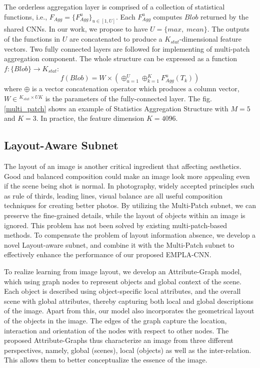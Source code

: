 \documentclass[10pt,twocolumn,letterpaper]{article}
\begin{document}
The orderless aggregation layer is comprised of a collection of statistical functions, 
i.e., ${F_{Agg}} = {\{ F_{Agg}^u\} _{u \in [1,U]}}$. Each $F_{Agg}^u$ computes
$Blob$ returned by the shared CNNs. In our work, we propose to have $U = \{ max,\;mean\} $. 
The outputs of the functions in $U$ are concatenated to produce a ${K_{stat}}$-dimensional feature vectors. Two fully connected layers are followed for implementing of multi-patch
aggregation component. The whole structure can be expressed as a function 
$f:\{ Blob\}  \to {{{K_{stat}}}}$:
\[f(Blob) = W \times ( \oplus _{u = 1}^U \oplus _{k = 1}^KF_{Agg}^u({T_k}))\]
where $ \oplus$ is a vector concatenation operator which produces a column vector, $W \in {^{{K_{stat}} \times UK}}$ is the parameters of the fully-connected layer. 
The fig. \ref{multi_patch} shows an example of Statistics Aggregation Structure with $M = 5$ and $K=3$. In practice, the feature dimension $K=4096$.

\subsection{Layout-Aware Subnet}
The layout of an image is another critical ingredient that
affecting aesthetics. Good and balanced composition could make an 
image look more appealing even if the scene being shot is normal. 
In photography, widely accepted principles such as rule of thirds, 
leading lines, visual balance are all useful composition techniques 
for creating better photos. 
By utilizing the Multi-Patch subnet, we can preserve the fine-grained 
details, while the layout of objects within an image is ignored. 
This problem has not been solved by existing multi-patch-based methods. 
To compensate the problem of layout information absence, we develop
a novel Layout-aware subnet, and combine it with the Multi-Patch subnet 
to effectively enhance the performance of our proposed EMPLA-CNN.

To realize learning from image layout, we develop an Attribute-Graph model, which using graph nodes to represent objects and global context of the scene. Each object is described using object-specific local attributes, and the overall scene with global attributes, thereby capturing both local and global 
descriptions of the image. Apart from this, our model also incorporates 
the geometrical layout of the objects in the image. The edges of the 
graph capture the location, interaction and orientation of the nodes 
with respect to other nodes. The proposed Attribute-Graphs thus characterize
an image from three different perspectives, namely, global (scenes), local (objects) as well as the inter-relation. This allows them to better conceptualize the essence of the image.
\end{document}
